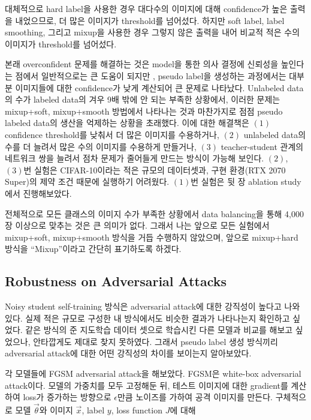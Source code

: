 대체적으로 hard label을 사용한 경우 대다수의 이미지에 대해 confidence가 높은 출력을 내었으므로, 더 많은 이미지가 threshold를 넘어섰다. 하지만 soft label, label smoothing, 그리고 mixup을 사용한 경우 그렇지 않은 출력을 내어 비교적 적은 수의 이미지가 threshold를 넘어섰다.

본래 overconfident 문제를 해결하는 것은 model을 통한 의사 결정에 신뢰성을 높인다는 점에서 일반적으로는 큰 도움이 되지만 \cite{guo2017calibration}, pseudo label을 생성하는 과정에서는 대부분 이미지들에 대한 confidence가 낮게 계산되어 큰 문제로 나타났다. Unlabeled data의 수가 labeled data의 겨우 9배 밖에 안 되는 부족한 상황에서, 이러한 문제는 mixup+soft, mixup+smooth 방법에서 나타나는 것과 마찬가지로 점점 pseudo labeled data의 생산을 억제하는 상황을 초래했다. 이에 대한 해결책은 $(1)$ confidence threshold를 낮춰서 더 많은 이미지를 수용하거나, $(2)$ unlabeled data의 수를 더 늘려서 많은 수의 이미지를 수용하게 만들거나, $(3)$ teacher-student 관계의 네트워크 쌍을 늘려서 점차 문제가 줄어들게 만드는 방식이 가능해 보인다. $(2)$, $(3)$번 실험은 CIFAR-10이라는 적은 규모의 데이터셋과, 구현 환경(RTX 2070 Super)의 제약 조건 때문에 실행하기 어려웠다. $(1)$번 실험은 뒷 장 ablation study에서 진행해보았다.

전체적으로 모든 클래스의 이미지 수가 부족한 상황에서 data balancing을 통해 4,000장 이상으로 맞추는 것은 큰 의미가 없다. 그래서 나는 앞으로 모든 실험에서 mixup+soft, mixup+smooth 방식을 거듭 수행하지 않았으며, 앞으로 mixup+hard 방식을 ``Mixup''이라고 간단히 표기하도록 하겠다.

\subsection{Robustness on Adversarial Attacks}

Noisy student self-training 방식은 adversarial attack에 대한 강직성이 높다고 나와있다. \cite{xie2020selftraining} 실제 적은 규모로 구성한 내 방식에서도 비슷한 결과가 나타나는지 확인하고 싶었다. 같은 방식의 준 지도학습 데이터 셋으로 학습시킨 다른 모델과 비교를 해보고 싶었으나, 안타깝게도 제대로 찾지 못하였다. 그래서 pseudo label 생성 방식끼리 adversarial attack에 대한 어떤 강직성의 차이를 보이는지 알아보았다.

각 모델들에 FGSM adversarial attack을 해보았다. FGSM은 white-box adversarial attack이다. 모델의 가중치를 모두 고정해둔 뒤, 테스트 이미지에 대한 gradient를 계산하여 loss가 증가하는 방향으로 $\epsilon$만큼 노이즈를 가하여 공격 이미지를 만든다. \cite{goodfellow2015explaining} 구체적으로 모델 $\vec \theta$와 이미지 $\vec x$, label $y$, loss function $J$에 대해

